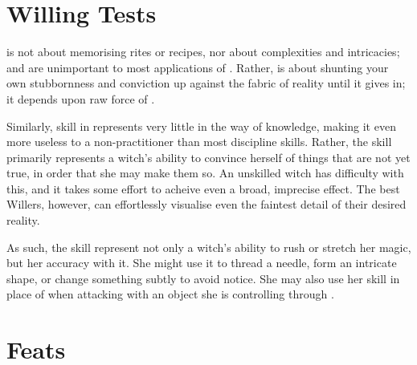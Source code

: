 \section{Willing Tests}

 is not about memorising rites or recipes, nor about complexities and intricacies;  and  are unimportant to most applications of .
Rather,  is about shunting your own stubbornness and conviction up against the fabric of reality until it gives in; it depends upon raw force of .

Similarly, skill in  represents very little in the way of knowledge, making it even more useless to a non-practitioner than most discipline skills.
Rather, the skill primarily represents a witch's ability to convince herself of things that are not yet true, in order that she may make them so.
An unskilled witch has difficulty with this, and it takes some effort to acheive even a broad, imprecise effect.
The best Willers, however, can effortlessly visualise even the faintest detail of their desired reality.

As such, the  skill represent not only a witch's ability to rush or stretch her magic, but her accuracy with it.
She might use it to thread a needle, form an intricate shape, or change something subtly to avoid notice.
She may also use her  skill in place of  when attacking with an object she is controlling through .

\section{Feats}



